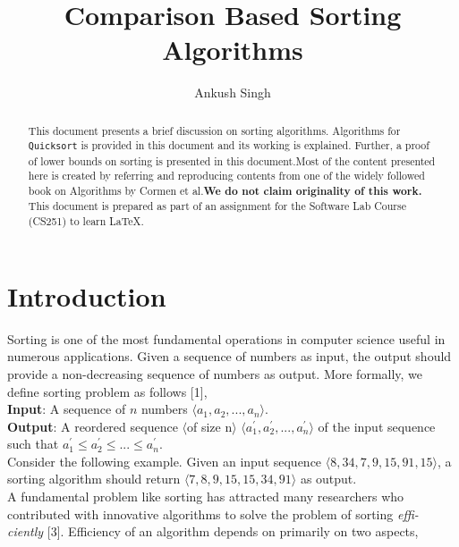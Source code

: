 \documentclass[a4paper, 15pt,twocolumn]{article}
\title{Comparison Based Sorting Algorithms}
\author{Ankush Singh}
\date{}
\begin{document}
\maketitle
\begin{abstract}
This document presents a brief discussion on sorting algorithms. Algorithms for \texttt{Quicksort} is provided in this document and its working is explained.
Further, a proof of lower bounds on sorting is presented in this document.Most of the content presented here is created by referring and reproducing
contents from one of the widely followed book on
Algorithms by Cormen et al\cite{cor}.\textbf{We do not claim
originality of this work.} This document is 
prepared as part of an assignment for the Software Lab
Course (CS251) to learn \LaTeX.
\noindent
{}
\end{abstract}
\section{Introduction}

Sorting is one of the most fundamental operations
in computer science useful in numerous applications. Given a sequence of numbers as input, the output should provide a non-decreasing sequence of numbers as output. More formally, we define
sorting problem as follows [1],\\
\textbf{Input}: A sequence of $n$ numbers $\langle a_1 , a_2 , ..., a_n\rangle$.\\
\textbf{Output}: A reordered sequence $\langle$of size n$\rangle$
$\langle a_1^{'} , a_2^{'} , ..., a_n^{'}\rangle$ of the input sequence such that $a_1^{'}\leq a_2^{'} \leq ... \leq a_n^{'} $.\\
Consider the following example. Given an input
sequence $\langle8, 34, 7, 9, 15, 91, 15 \rangle$, a sorting algorithm
should return $\langle7, 8, 9, 15, 15, 34, 91\rangle$ as output.\\
A fundamental problem like sorting has attracted
many researchers who contributed with innovative
algorithms to solve the problem of sorting \textit{effi-
ciently} [3]. Efficiency of an algorithm depends on
primarily on two aspects,
\end{document}
